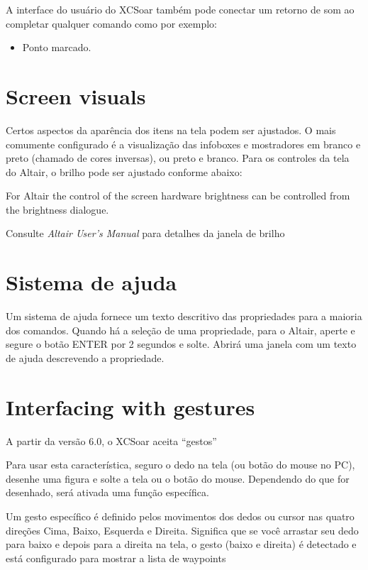 A interface do usuário do XCSoar também pode conectar um retorno de som ao completar qualquer comando como por exemplo:
\begin{itemize}
\item Ponto marcado.
\end{itemize}


\section{Screen visuals}

Certos aspectos da aparência dos itens na tela podem ser ajustados.  O mais comumente configurado é a visualização das infoboxes e mostradores em branco e preto (chamado de cores inversas), ou preto e branco.
Para os controles da tela do Altair, o brilho pode ser ajustado conforme abaixo:


For Altair the control of the screen hardware 
brightness can be controlled from the brightness dialogue.
\begin{quote}
\blink{}
\end{quote}

Consulte {\em Altair User's Manual} para detalhes da janela de brilho


\section{Sistema de ajuda}

Um sistema de ajuda fornece um texto descritivo das propriedades para a maioria dos comandos.  Quando há a seleção de uma propriedade, para o Altair, aperte e segure o botão ENTER por 2 segundos e solte. Abrirá uma janela com um texto de ajuda descrevendo a propriedade.  

\section{Interfacing with gestures}\label{sec:gestures}
A partir da versão 6.0, o XCSoar aceita “gestos”

Para usar esta característica, seguro o dedo na tela (ou botão do mouse no PC), desenhe uma figura e solte a tela ou o botão do mouse.  Dependendo do que for desenhado, será ativada uma função específica. 

Um gesto específico é definido pelos movimentos dos dedos ou cursor nas quatro direções Cima, Baixo, Esquerda e Direita.  Significa que se você arrastar seu dedo para baixo e depois para a direita na tela, o gesto  (baixo e direita) é detectado e está configurado para mostrar a lista de waypoints
 
